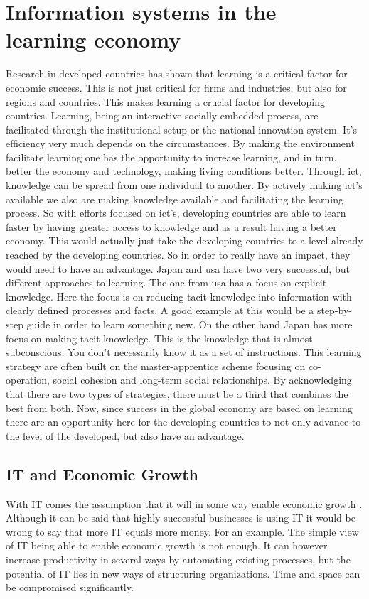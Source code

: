 
\section{Information systems in the learning economy}
\label{infolearnec}
Research in developed countries has shown that learning is a critical factor for economic success.
This is not just critical for firms and industries, but also for regions and countries.
This makes learning a crucial factor for developing countries. 
Learning, being an interactive socially embedded process, are facilitated through the institutional setup or the national innovation system. It's efficiency very much depends on the circumstances.
By making the environment facilitate learning one has the opportunity to increase learning, and in turn, better the economy and technology, making living conditions better. 
Through \gls{ict}, knowledge can be spread from one individual to another. 
By actively making \gls{ict}'s available we also are making knowledge available and facilitating the learning process. 
So with efforts focused on \gls{ict}'s, developing countries are able to learn faster by having greater access to knowledge and as a result having a better economy.
This would actually just take the developing countries to a level already reached by the developing countries. So in order to really have an impact, they would need to have an advantage. 
Japan and \gls{usa} have two very successful, but different approaches to learning. 
The one from \gls{usa} has a focus on explicit knowledge. Here the focus is on reducing tacit knowledge into information with clearly defined processes and facts. A good example at this would be a step-by-step guide in order to learn something new. 
On the other hand Japan has more focus on making tacit knowledge. This is the knowledge that is almost subconscious. You don't necessarily know it as a set of instructions. This learning strategy are often built on the master-apprentice scheme focusing on co-operation, social cohesion and long-term social relationships. 
By acknowledging that there are two types of strategies, there must be a third that combines the best from both. 
Now, since success in the global economy are based on learning there are an opportunity here for the developing countries to not only advance to the level of the developed, but also have an advantage. 

\cite{gedi:erik}


\subsection{IT and Economic Growth}
With IT comes the assumption that it will in some way enable economic growth \cite{ca:ieeg}.
Although it can be said that highly successful businesses is using IT it would be wrong to say that more IT equals more money.
For an example.
The simple view of IT being able to enable economic growth is not enough.
It can however increase productivity in several ways by automating existing processes, but the potential of IT lies in new ways of structuring organizations.
Time and space can be compromised significantly.

